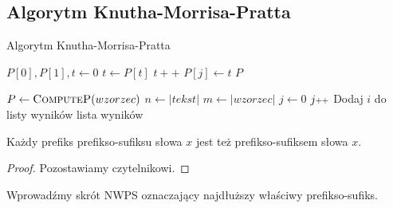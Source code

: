 \subsection{Algorytm Knutha-Morrisa-Pratta}

\begin{algorithm}[H]
	\caption{Algorytm Knutha-Morrisa-Pratta}
	\label{KMP}
	\begin{algorithmic}[1]
		\State $P[0], P[1], t \gets 0$
		\State $t \gets P[t]$
		\EndWhile
		\State $t++$
		\EndIf
		\State $P[j] \gets t$
		\EndFor
		\State \Return $P$
		\EndProcedure
		
		\State $P \gets \textsc{ComputeP}(wzorzec)$
		\State $n \gets |tekst|$
		\State $m \gets |wzorzec|$
		\State $j \gets 0$
				\State $j\pp$
			\EndWhile
				\State Dodaj $i$ do listy wyników
			\EndIf
		\EndFor
		\State \Return lista wyników
		\EndProcedure		
	\end{algorithmic}
\end{algorithm}

\begin{fact}
	\label{prefiksosufiks}
	Każdy prefiks prefikso-sufiksu słowa $x$ jest też prefikso-sufiksem słowa $x$.
	\begin{proof}
		Pozostawiamy czytelnikowi.
	\end{proof}
\end{fact}

Wprowadźmy skrót NWPS oznaczający najdłuższy właściwy prefikso-sufiks.

